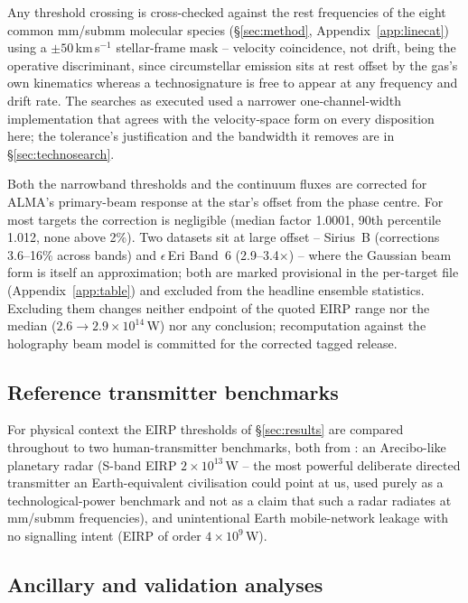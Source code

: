 \documentclass{openjournal}
\begin{document}
Any threshold crossing is cross-checked against the rest frequencies
of the eight common mm/submm molecular species (\S\ref{sec:method},
Appendix~\ref{app:linecat}) using a $\pm50$\,km\,s$^{-1}$
stellar-frame mask -- velocity coincidence, not drift, being the
operative discriminant, since circumstellar emission sits at rest
offset by the gas's own kinematics whereas a technosignature is free
to appear at any frequency and drift rate. The searches as executed
used a narrower one-channel-width implementation that agrees with the
velocity-space form on every disposition here; the tolerance's
justification and the bandwidth it removes are in
\S\ref{sec:technosearch}.

Both the narrowband thresholds and the continuum fluxes are corrected
for ALMA's primary-beam response at the star's offset from the phase
centre. For most targets the correction is negligible (median factor
1.0001, 90th percentile 1.012, none above 2\%). Two datasets sit at
large offset -- Sirius~B (corrections 3.6--16\% across bands) and
$\epsilon$\,Eri Band~6 (2.9--3.4$\times$) -- where the Gaussian beam
form is itself an approximation; both are marked provisional in
the per-target file (Appendix~\ref{app:table}) and excluded from the headline ensemble
statistics. Excluding them changes neither endpoint of the quoted
EIRP range nor the median ($2.6\to2.9\times10^{14}$\,W) nor any
conclusion; recomputation against the holography beam model is
committed for the corrected tagged release.
\subsection{Reference transmitter benchmarks}
\label{sec:benchmarks}

For physical context the EIRP thresholds of \S\ref{sec:results} are
compared throughout to two human-transmitter benchmarks, both from
\citet{EarthDetectingEarth2025}: an Arecibo-like planetary radar
(S-band EIRP $2\times10^{13}$\,W -- the most powerful deliberate
directed transmitter an Earth-equivalent civilisation could point at
us, used purely as a technological-power benchmark and not as a claim
that such a radar radiates at mm/submm frequencies), and unintentional
Earth mobile-network leakage with no signalling intent (EIRP of order
$4\times10^{9}$\,W).

\subsection{Ancillary and validation analyses}
\label{sec:ancillary}
\end{document}
